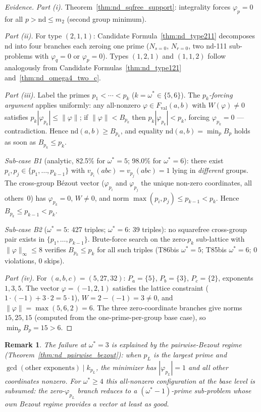 \documentclass[12pt]{article}
\newtheorem{remark}{Remark}
\theoremstyle{definition}
\begin{document}
\begin{proof}[Evidence]
  \textit{Part (i).}  Theorem~\ref{thm:nd_sqfree_support}: integrality forces
  $\varphi_p=0$ for all $p > \mathrm{nd} \le m_2$ (second group minimum).

  \textit{Part (ii).}  For type $(2,1,1)$: Candidate Formula~\ref{thm:nd_type211}
  decomposes $\mathrm{nd}$ into four branches each zeroing one prime
  ($N_{s=0}$, $N_{r=0}$, two nd-111 sub-problems with $\varphi_q=0$ or
  $\varphi_p=0$).  Types $(1,2,1)$ and $(1,1,2)$ follow analogously
  from Candidate Formulas~\ref{thm:nd_type121} and~\ref{thm:nd_omega4_two_c}.

  \textit{Part (iii).}  Label the primes $p_1<\cdots<p_k$ ($k=\omega^*\in\{5,6\}$).
  The \emph{$p_k$-forcing argument} applies uniformly:
  any all-nonzero $\varphi\in F_{\mathrm{val}}(a,b)$ with $W(\varphi)\ne 0$
  satisfies $p_k|\varphi_{p_k}|\le\|\varphi\|$; if $\|\varphi\|<B_{p_k}$ then
  $p_k|\varphi_{p_k}|<p_k$, forcing $\varphi_{p_k}=0$ — contradiction.
  Hence nd$(a,b)\ge B_{p_k}$, and equality nd$(a,b)=\min_p B_p$ holds as soon as
  $B_{p_k}\le p_k$.

  \textit{Sub-case B1} (analytic, 82.5\% for $\omega^*=5$; 98.0\% for $\omega^*=6$):
  there exist $p_i,p_j\in\{p_1,\ldots,p_{k-1}\}$ with $v_{p_i}(abc)=v_{p_j}(abc)=1$
  lying in \emph{different} groups.  The cross-group Bézout vector
  ($\varphi_{p_i}$ and $\varphi_{p_j}$ the unique non-zero coordinates,
  all others~$0$) has $\varphi_{p_k}=0$, $W\ne 0$, and
  norm $\max(p_i,p_j)\le p_{k-1}<p_k$.  Hence $B_{p_k}\le p_{k-1}<p_k$.

  \textit{Sub-case B2} ($\omega^*=5$: 427 triples; $\omega^*=6$: 39 triples):
  no squarefree cross-group pair exists in $\{p_1,\ldots,p_{k-1}\}$.
  Brute-force search on the zero-$p_k$ sub-lattice with $\|\varphi\|_\infty\le 8$
  verifies $B_{p_k}\le p_k$ for all such triples
  (T86bis $\omega^*=5$; T85bis $\omega^*=6$; $0$ violations, $0$ skips).

  \textit{Part (iv).}  For $(a,b,c)=(5,27,32)$: $P_a=\{5\}$, $P_b=\{3\}$,
  $P_c=\{2\}$, exponents $1,3,5$.  The vector $\varphi=(-1,2,1)$ satisfies
  the lattice constraint ($1\cdot(-1)+3\cdot2=5\cdot1$), $W=2-(-1)=3\ne 0$,
  and $\|\varphi\|=\max(5,6,2)=6$.  The three zero-coordinate branches give
  norms $15,25,15$ (computed from the one-prime-per-group base case), so
  $\min_p B_p=15>6$.
\end{proof}

\begin{remark}
  The failure at $\omega^*=3$ is explained by the pairwise-Bezout regime
  (Theorem~\ref{thm:nd_pairwise_bezout}): when $p_L$ is the largest prime and
  $\gcd(\text{other exponents}) \mid k_{p_L}$, the minimizer has $|\varphi_{p_L}|=1$
  and all other coordinates nonzero.
  For $\omega^*\ge 4$ this all-nonzero configuration at the base level is
  \emph{subsumed}: the zero-$\varphi_{p_L}$ branch reduces to a $(\omega^*-1)$-prime
  sub-problem whose own Bezout regime provides a vector at least as good.
\end{remark}
\end{document}
